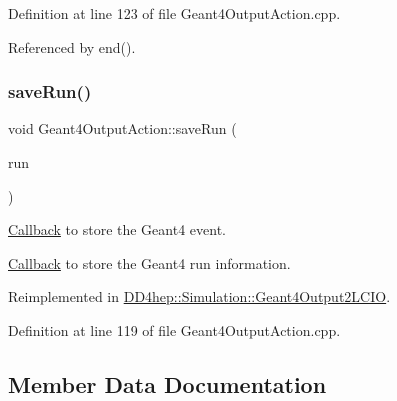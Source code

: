 Definition at line 123 of file Geant4\+Output\+Action.\+cpp.



Referenced by end().

\hypertarget{class_d_d4hep_1_1_simulation_1_1_geant4_output_action_a4016b3e0ee787a3ac3d1fcd7a4c84a68}{}\label{class_d_d4hep_1_1_simulation_1_1_geant4_output_action_a4016b3e0ee787a3ac3d1fcd7a4c84a68} 
\subsubsection{\texorpdfstring{save\+Run()}{saveRun()}}
{\footnotesize\ttfamily void Geant4\+Output\+Action\+::save\+Run (\begin{DoxyParamCaption}\item[{const G4\+Run $\ast$}]{run }\end{DoxyParamCaption})\hspace{0.3cm}{\ttfamily [virtual]}}



\hyperlink{class_d_d4hep_1_1_callback}{Callback} to store the Geant4 event. 

\hyperlink{class_d_d4hep_1_1_callback}{Callback} to store the Geant4 run information. 

Reimplemented in \hyperlink{class_d_d4hep_1_1_simulation_1_1_geant4_output2_l_c_i_o_a0fa2240decba857840eed494d6349f5f}{D\+D4hep\+::\+Simulation\+::\+Geant4\+Output2\+L\+C\+IO}.



Definition at line 119 of file Geant4\+Output\+Action.\+cpp.



\subsection{Member Data Documentation}
\hypertarget{class_d_d4hep_1_1_simulation_1_1_geant4_output_action_a7d76cce37c53f07c27f41a887fc05dbe}{}\label{class_d_d4hep_1_1_simulation_1_1_geant4_output_action_a7d76cce37c53f07c27f41a887fc05dbe} 
